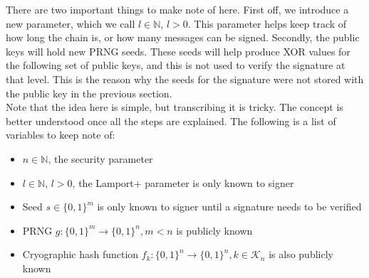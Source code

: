 \documentclass[]{scrartcl}
\begin{document}
There are two important things to make note of here. First off, we introduce a new parameter, which we call $l \in \mathbb{N}$, $l > 0$. This parameter helps keep track of how long the chain is, or how many messages can be signed. Secondly, the public keys will hold new PRNG seeds. These seeds will help produce XOR values for the following set of public keys, and this is not used to verify the signature at that level. This is the reason why the seeds for the signature were not stored with the public key in the previous section.\\

Note that the idea here is simple, but transcribing it is tricky. The concept is better understood once all the steps are explained. The following is a list of variables to keep note of:
\begin{itemize}
	\item $n \in \mathbb{N}$, the security parameter 
	\item $l \in \mathbb{N}$, $l > 0$, the Lamport+ parameter is only known to signer
	\item Seed $s \in \{0,1\}^m$ is only known to signer until a signature needs to be verified
	\item PRNG $g : \{0,1\}^m \rightarrow \{0,1\}^n, m < n$ is publicly known
	\item Cryographic hash function $f_k : \{0,1\}^n \rightarrow \{0,1\}^n, k \in \mathcal{K}_n$ is also publicly known
\end{itemize}
\end{document}

